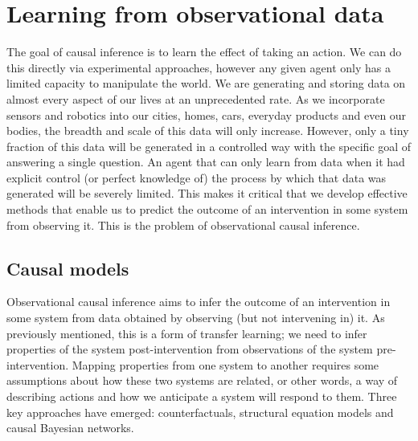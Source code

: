 \documentclass[11pt,a4paper,twoside]{report}
\theoremstyle{plain}
\theoremstyle{definition}
\begin{document}
\chapter{Learning from observational data}
\label{chap:causality}

The goal of causal inference is to learn the effect of taking an action. We can do this directly via experimental approaches, however any given agent only has a limited capacity to manipulate the world. We are generating and storing data on almost every aspect of our lives at an unprecedented rate. As we incorporate sensors and robotics into our cities, homes, cars, everyday products and even our bodies, the breadth and scale of this data will only increase. However, only a tiny fraction of this data will be generated in a controlled way with the specific goal of answering a single question. An agent that can only learn from data when it had explicit control (or perfect knowledge of) the process by which that data was generated will be severely limited. This makes it critical that we develop effective methods that enable us to predict the outcome of an intervention in some system from observing it. This is the problem of observational causal inference. 

\section{Causal models}
\label{sec:causal_models}

Observational causal inference aims to infer the outcome of an intervention in some system from data obtained by observing (but not intervening in) it. As previously mentioned, this is a form of transfer learning; we need to infer properties of the system post-intervention from observations of the system pre-intervention. Mapping properties from one system to another requires some assumptions about how these two systems are related, or other words, a way of describing actions and how we anticipate a system will respond to them. Three key approaches have emerged: counterfactuals, structural equation models and causal Bayesian networks. 
\end{document}
